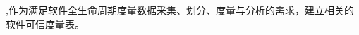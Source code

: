 ,作为满足软件全生命周期度量数据采集、划分、度量与分析的需求，建立相关的软件可信度量表。

\begin{defn}
\end{defn}

\begin{defn}
\end{defn}
\begin{defn}
\begin{align*}
\end{align*}
\end{defn}



